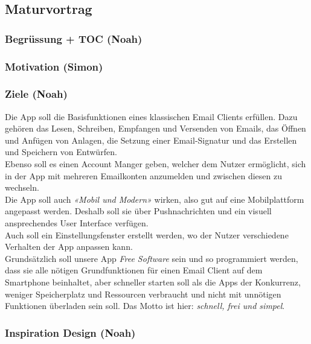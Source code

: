 \documentclass[a4paper,10pt]{scrartcl}
\begin{document}
\begin{multicols}{3}

\section{Maturvortrag}

\subsubsection*{Begrüssung + TOC (Noah)}

\subsubsection*{Motivation (Simon)}

\subsubsection*{Ziele (Noah)}

Die App soll die Basisfunktionen eines klassischen Email Clients
erfüllen. Dazu gehören das Lesen, Schreiben, Empfangen und Versenden von
Emails, das Öffnen und Anfügen von Anlagen, die Setzung einer
Email-Signatur und das Erstellen und Speichern von Entwürfen.\\

Ebenso soll es einen Account Manger geben, welcher dem Nutzer
ermöglicht, sich in der App mit mehreren Emailkonten anzumelden und
zwischen diesen zu wechseln.\\

Die App soll auch \emph{«Mobil und Modern»} wirken, also gut auf eine
Mobilplattform angepasst werden. Deshalb soll sie über Pushnachrichten
und ein visuell ansprechendes User Interface verfügen.\\

Auch soll ein Einstellungsfenster erstellt werden, wo der Nutzer
verschiedene Verhalten der App anpassen kann.\\

Grundsätzlich soll unsere App \emph{Free Software} sein und so
programmiert werden, dass sie alle nötigen Grundfunktionen für einen
Email Client auf dem Smartphone beinhaltet, aber schneller starten soll
als die Apps der Konkurrenz, weniger Speicherplatz und Ressourcen
verbraucht und nicht mit unnötigen Funktionen überladen sein soll. Das
Motto ist hier: \emph{schnell, frei und simpel}.

\subsubsection*{Inspiration Design (Noah)}


\end{multicols}
\end{document}
